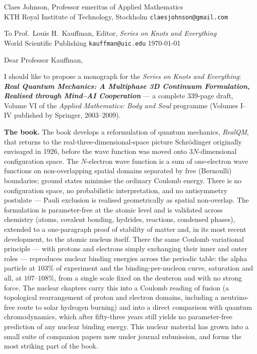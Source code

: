\documentclass[11pt]{article}
\begin{document}
\noindent
Claes Johnson, Professor emeritus of Applied Mathematics \\
KTH Royal Institute of Technology, Stockholm \quad\textbar\quad \texttt{claesjohnson@gmail.com}

\vspace{1em}

\noindent
To Prof.\ Louis H.\ Kauffman, Editor, \emph{Series on Knots and Everything} \\
World Scientific Publishing \quad\textbar\quad \texttt{kauffman@uic.edu} \hfill \today

\vspace{1em}

\noindent Dear Professor Kauffman,

\medskip

I should like to propose a monograph for the \emph{Series on Knots and
Everything}: \textbf{\emph{Real Quantum Mechanics: A Multiphase 3D Continuum
Formulation, Realised through Mind--AI Cooperation}} --- a complete 339-page
draft, Volume VI of the \emph{Applied Mathematics: Body and Soul} programme
(Volumes I--IV published by Springer, 2003--2009).

\medskip
\noindent\textbf{The book.}
The book develops a reformulation of quantum mechanics, \emph{RealQM}, that
returns to the real-three-dimensional-space picture Schr\"odinger originally
envisaged in 1926, before the wave function was moved onto $3N$-dimensional
configuration space. The $N$-electron wave function is a sum of one-electron
wave functions on non-overlapping spatial domains separated by free (Bernoulli)
boundaries; ground states minimise the ordinary Coulomb energy. There is no
configuration space, no probabilistic interpretation, and no antisymmetry
postulate --- Pauli exclusion is realised geometrically as spatial non-overlap.
The formulation is parameter-free at the atomic level and is validated across
chemistry (atoms, covalent bonding, hydrides, reactions, condensed phases),
extended to a one-paragraph proof of stability of matter and, in its most
recent development, to the atomic nucleus itself. There the same Coulomb
variational principle --- with protons and electrons simply exchanging their
inner and outer roles --- reproduces nuclear binding energies across the
periodic table: the alpha particle at $103\%$ of experiment and the
binding-per-nucleon curve, saturation and all, at $107$--$108\%$, from a single
scale fixed on the deuteron and with no strong force. The nuclear chapters
carry this into a Coulomb reading of fusion (a topological rearrangement of
proton and electron domains, including a neutrino-free route to solar hydrogen
burning) and into a direct comparison with quantum chromodynamics, which after
fifty-three years still yields no parameter-free prediction of any nuclear
binding energy. This nuclear material has grown into a small suite of companion
papers now under journal submission, and forms the most striking part of the
book.
\end{document}
